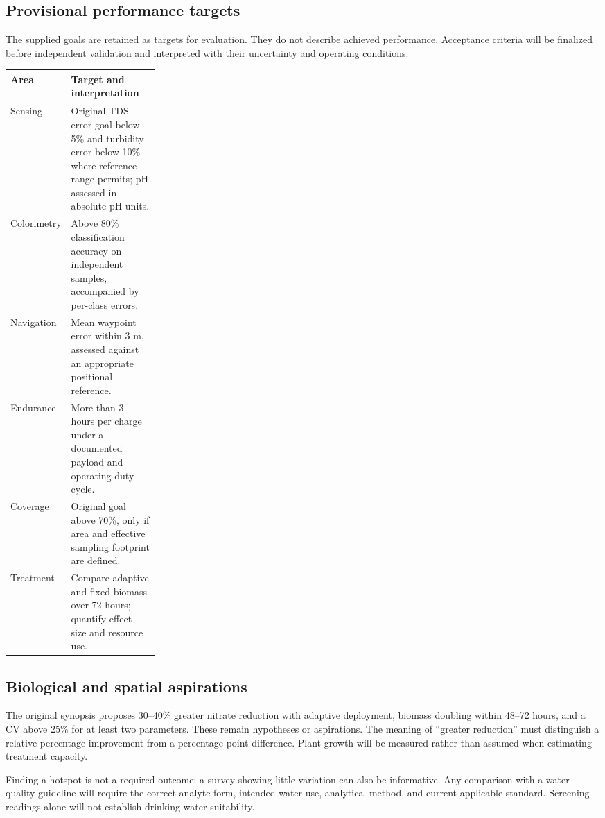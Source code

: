 \documentclass[12pt,a4paper]{article}
\begin{document}
\subsection{Provisional performance targets}
The supplied goals are retained as targets for evaluation. They do not describe achieved performance. Acceptance criteria will be finalized before independent validation and interpreted with their uncertainty and operating conditions.
\begin{center}\small
\begin{tabularx}{\linewidth}{@{}p{0.25\linewidth}Y@{}}
\toprule Area & Target and interpretation\\\midrule
Sensing & Original TDS error goal below 5\% and turbidity error below 10\% where reference range permits; pH assessed in absolute pH units.\\
Colorimetry & Above 80\% classification accuracy on independent samples, accompanied by per-class errors.\\
Navigation & Mean waypoint error within 3 m, assessed against an appropriate positional reference.\\
Endurance & More than 3 hours per charge under a documented payload and operating duty cycle.\\
Coverage & Original goal above 70\%, only if area and effective sampling footprint are defined.\\
Treatment & Compare adaptive and fixed biomass over 72 hours; quantify effect size and resource use.\\
\bottomrule
\end{tabularx}\end{center}

\subsection{Biological and spatial aspirations}
The original synopsis proposes 30--40\% greater nitrate reduction with adaptive deployment, biomass doubling within 48--72 hours, and a CV above 25\% for at least two parameters. These remain hypotheses or aspirations. The meaning of ``greater reduction'' must distinguish a relative percentage improvement from a percentage-point difference. Plant growth will be measured rather than assumed when estimating treatment capacity.

Finding a hotspot is not a required outcome: a survey showing little variation can also be informative. Any comparison with a water-quality guideline will require the correct analyte form, intended water use, analytical method, and current applicable standard. Screening readings alone will not establish drinking-water suitability.
\end{document}
